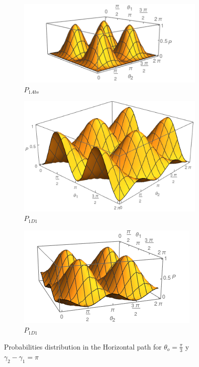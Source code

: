\documentclass[12pt]{book}
\begin{document}
\begin{figure}[t!]
\centering
\begin{subfigure}[b]{0.45\linewidth}
\includegraphics[width=\linewidth]{images/P11abs.png}
\caption{$P_{1Abs}$}
\label{fig:BS1}
\end{subfigure}
\begin{subfigure}[b]{0.45\linewidth}
\includegraphics[width=\linewidth ,height=3 cm]{images/P11d1.png}
\caption{$P_{1D1}$}
\label{fig:westminster_aerea}
\end{subfigure}
\begin{subfigure}[b]{0.45\linewidth}
\includegraphics[width=\linewidth]{images/P11d2.png}
\caption{$P_{1D1}$}
\label{fig:BS1}
\end{subfigure}
\caption{Probabilities distribution in the Horizontal path for $\theta_{o}=\frac{\pi}{3}$ y $\gamma_{2}-\gamma_{1}=\pi$}
\label{fig:westminster}
\end{figure} 
\end{document}
